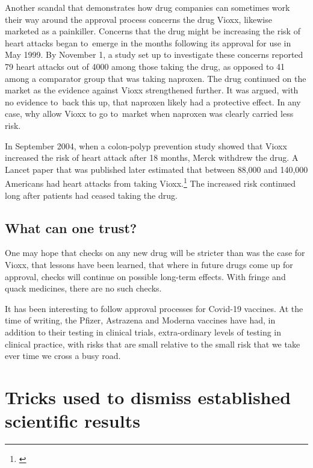 \documentclass[
  10pt,
  b5paper]{book}
\begin{document}
Another scandal that demonstrates how drug companies can
sometimes work their way around the approval process
concerns the drug Vioxx, likewise marketed as a
painkiller.\citep{valentine2007timeline} Concerns that the
drug might be increasing the risk of heart attacks began
to~emerge in the months following its approval for use
in May 1999. By November 1, a study set up to investigate
these concerns reported 79 heart attacks out of 4000
among those taking the drug, as opposed to 41 among a
comparator group that was taking naproxen. The drug
continued on the market as the evidence against Vioxx
strengthened further. It was argued, with no evidence
to~back this up, that naproxen likely had a protective
effect. In any case, why allow Vioxx to go to~market
when naproxen was clearly carried less risk.

In September 2004,
when a colon-polyp prevention study showed that Vioxx
increased the risk of heart attack after 18 months,
Merck withdrew the drug. A Lancet paper that was
published later estimated that between 88,000 and
140,000 Americans had heart attacks from taking
Vioxx.\footnote{\citet{juni2004risk}} The increased risk continued
long after patients had ceased taking the drug.

\hypertarget{what-can-one-trust}{%
\subsection*{What can one trust?}\label{what-can-one-trust}}

One may hope that checks on any new drug will be
stricter than was the case for Vioxx, that lessons
have been learned, that where in future drugs come
up for approval, checks will continue on possible
long-term effects. With fringe and quack medicines,
there are no such checks.

It has been interesting to follow approval processes
for Covid-19 vaccines. At the time of writing, the
Pfizer, Astrazena and Moderna vaccines have had, in
addition to their testing in clinical trials,
extra-ordinary levels of testing in clinical practice,
with risks that are small relative to the small risk
that we take ever time we cross a busy road.

\hypertarget{tricks-used-to-dismiss-established-scientific-results}{%
\section{Tricks used to dismiss established scientific results}\label{tricks-used-to-dismiss-established-scientific-results}}
\end{document}
